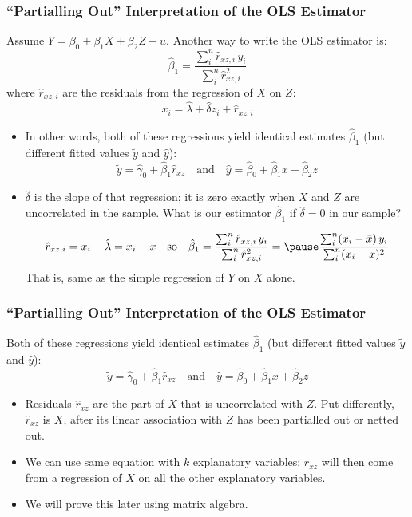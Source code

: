 \documentclass[xcolor=svgnames,9pt,english,aspectratio=169,t]{beamer}
\begin{document}
\begin{frame}[t]
\frametitle{``Partialling Out'' Interpretation of the OLS Estimator}
\small
Assume $Y = \beta_0 + \beta_1 X + \beta_2 Z + u$. Another way to write the OLS estimator is:
$$
\hat{\beta}_1 = \frac{\sum_i^n \hat{r}_{xz,i}\,y_i}{\sum_i^n\hat{r}^2_{xz,i}}
$$
where $\hat{r}_{xz,i}$ are the residuals from the regression of $X$ on $Z$:
$$
x_i = \hat{\lambda} + \hat{\delta} z_i + \hat{r}_{xz,i}
$$
\pause
\vspace{-1em}\begin{itemize}
\item In other words, both of these regressions yield identical estimates $\hat{\beta}_1$ (but different fitted values $\tilde{y}$ and $\hat{y}$):
$$
\tilde{y} = \hat{\gamma}_0 + \hat{\beta}_1 \hat{r}_{xz} \quad \mbox{and} \quad \hat{y} = \hat{\beta}_0 + \hat{\beta}_1 x + \hat{\beta}_2 z
$$\pause\vspace{-1em}
\item $\hat\delta$ is the slope of that regression; it is zero exactly when $X$ and $Z$ are uncorrelated in the sample. \pause What is our estimator $\hat{\beta}_1$ if $\hat\delta=0$ in our sample? \pause

$$\hat r_{xz,i} = x_i - \hat{\lambda}= x_i - \bar{x} \quad \text{so} \quad \hat{\beta}_1 = \frac{\sum_i^n \hat{r}_{xz,i}\,y_i}{\sum_i^n\hat{r}^2_{xz,i}}= \pause \frac{\sum_i^n ( x_i - \bar{x})\,y_i}{\sum_i^n ( x_i - \bar{x})^2 }$$
That is, same as the simple regression of $Y$ on $X$ alone. 
\end{itemize}

\end{frame}


\begin{frame}[t]
\frametitle{``Partialling Out'' Interpretation of the OLS Estimator}
Both of these regressions yield identical estimates $\hat{\beta}_1$ (but different fitted values $\tilde{y}$ and $\hat{y}$):
$$
\tilde{y} = \hat{\gamma}_0 + \hat{\beta}_1 \hat{r}_{xz} \quad \mbox{and} \quad \hat{y} = \hat{\beta}_0 + \hat{\beta}_1 x + \hat{\beta}_2 z
$$
\begin{itemize}
\item Residuals $\hat{r}_{xz}$ are the part of $X$ that is uncorrelated with $Z$. Put differently, $\hat{r}_{xz}$ is $X$, after its linear association with $Z$ has been \alert{partialled out} or netted out.
\item We can use same equation with $k$ explanatory variables; $\hat{r}_{xz}$ will then come from a regression of $X$ on all the other explanatory variables.
\item We will prove this later using matrix algebra.
\end{itemize}
\end{frame}
\end{document}

